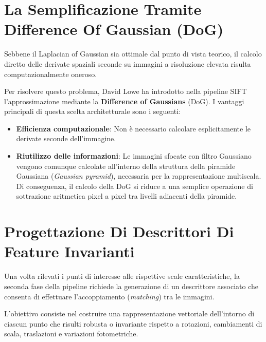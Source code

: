 ﻿\documentclass[11pt, a4paper]{article}
\begin{document}
\newpage

\section{La Semplificazione Tramite Difference Of Gaussian (DoG)}

Sebbene il Laplacian of Gaussian sia ottimale dal punto di vista teorico, il calcolo diretto delle derivate spaziali seconde su immagini a risoluzione elevata risulta computazionalmente oneroso.


Per risolvere questo problema, David Lowe ha introdotto nella pipeline SIFT l'approssimazione mediante la \textbf{Difference of Gaussians} (DoG). I vantaggi principali di questa scelta architetturale sono i seguenti:
\begin{itemize}
    \item \textbf{Efficienza computazionale}: Non è necessario calcolare esplicitamente le derivate seconde dell'immagine.
    \item \textbf{Riutilizzo delle informazioni}: Le immagini sfocate con filtro Gaussiano vengono comunque calcolate all'interno della struttura della piramide Gaussiana (\emph{Gaussian pyramid}), necessaria per la rappresentazione multiscala. Di conseguenza, il calcolo della DoG si riduce a una semplice operazione di sottrazione aritmetica pixel a pixel tra livelli adiacenti della piramide.
\end{itemize}

\newpage

\section{Progettazione Di Descrittori Di Feature Invarianti}

Una volta rilevati i punti di interesse alle rispettive scale caratteristiche, la seconda fase della pipeline richiede la generazione di un descrittore associato che consenta di effettuare l'accoppiamento (\emph{matching}) tra le immagini.


L'obiettivo consiste nel costruire una rappresentazione vettoriale dell'intorno di ciascun punto che risulti robusta o invariante rispetto a rotazioni, cambiamenti di scala, traslazioni e variazioni fotometriche.
\end{document}
